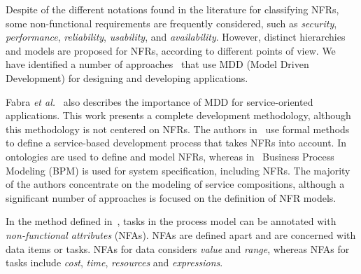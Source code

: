 \documentclass[english,12pt]{article}
\begin{document}

Despite of the different notations found in the literature for classifying NFRs, some non-functional requirements are frequently considered, such as \textit{security}, \textit{performance}, \textit{reliability}, \textit{usability}, and \textit{availability}.
However, distinct hierarchies and models are proposed for NFRs,  according to different points of view.
We have identified a number of approaches~\cite{DAmbrogio06,CholletL09,SchmelingCM11,BasinDL06,Fabra2011,OvaskaEHPA10} that use MDD (Model Driven Development) for designing and developing applications. 




Fabra \textit{et al.}~\cite{Fabra2011} also describes the importance of  MDD for service-oriented applications. This work  presents a complete development methodology, although this methodology is not centered on NFRs.
The authors in~\cite{ThissenW06,ZhangPSP05} use formal methods to define a service-based development process that takes NFRs into account. 
In~\cite{AgarwalLS09,PastranaPK11} ontologies are used to define and model NFRs, 
whereas in~\cite{XiaoCZBOLH08,GutierrezRF10} Business Process Modeling (BPM) is used for
system specification, including NFRs. 
The majority of the authors concentrate on the  modeling of service compositions, although a significant number of approaches is focused on the definition of NFR models.


In the method defined in~\cite{XiaoCZBOLH08}, tasks in the process model can be 
annotated with \textit{non-functional attributes} (NFAs). 
NFAs are defined apart  and are concerned with data items or tasks. 
NFAs for data considers \textit{value} and \textit{range}, whereas NFAs for tasks include \textit{cost}, \textit{time}, \textit{resources} and \textit{expressions}.
\end{document}
